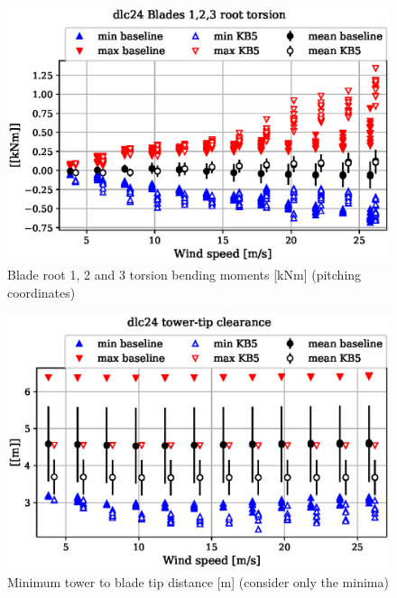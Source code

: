 \begin{figure}[!ht]
\begin{center}
	\includegraphics[width=.85\linewidth]{figures/baseline-vs-KB6/dlc24/blade1-blade1-node-001-momentvec-z_AA0007_AA0003.eps}
\end{center}
\caption{Blade root 1, 2 and 3 torsion bending moments [kNm] (pitching coordinates)}
\label{fig:baseline-vs-KB6:dlc24:blade-root-torsion}
\end{figure}

\begin{figure}[!ht]
\begin{center}
	\includegraphics[width=.85\linewidth]{figures/baseline-vs-KB6/dlc24/DLL-towerclearance_mblade-inpvec-1_AA0007_AA0003.eps}
\end{center}
\caption{Minimum tower to blade tip distance [m] (consider only the minima)}
\label{fig:baseline-vs-KB6:dlc24:tower-tip-clearance}
\end{figure}

